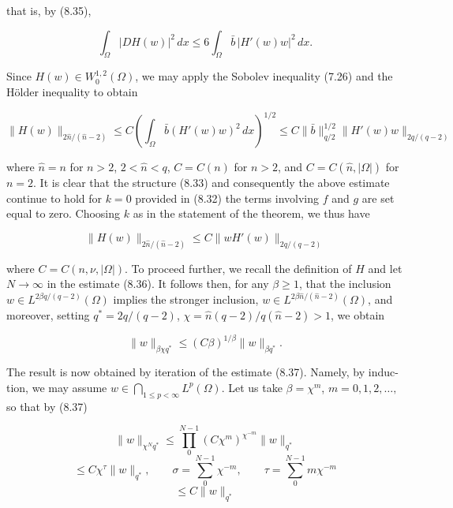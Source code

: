 
that is, by (8.35),

\begin{equation*}
\int_{\Omega} |DH(w)|^2\,dx \le 6 \int_{\Omega} \bar b\,|H'(w)w|^2\,dx.
\end{equation*}

Since $H(w)\in W_0^{1,2}(\Omega)$, we may apply the Sobolev inequality (7.26) and the Hölder
inequality to obtain

\begin{equation*}
\|H(w)\|_{2\hat n/(\hat n-2)} \le C\left(\int_{\Omega} \bar b(H'(w)w)^2\,dx\right)^{1/2}
 \le C\|\bar b\|_{q/2}^{1/2}\|H'(w)w\|_{2q/(q-2)}
\end{equation*}

where $\hat n=n$ for $n>2$, $2<\hat n<q$, $C=C(n)$ for $n>2$, and $C=C(\hat n,|\Omega|)$ for $n=2$. It is
clear that the structure (8.33) and consequently the above estimate continue to
hold for $k=0$ provided in (8.32) the terms involving $f$ and $g$ are set equal to zero.
Choosing $k$ as in the statement of the theorem, we thus have

\begin{equation}\tag{8.36}
\|H(w)\|_{2\hat n/(\hat n-2)} \le C\|wH'(w)\|_{2q/(q-2)}
\end{equation}

where $C=C(n,\nu,|\Omega|)$. To proceed further, we recall the definition of $H$ and let
$N\to\infty$ in the estimate (8.36). It follows then, for any $\beta\ge 1$, that the inclusion
$w\in L^{2\beta q/(q-2)}(\Omega)$ implies the stronger inclusion, $w\in L^{2\beta\hat n/(\hat n-2)}(\Omega)$, and moreover,
setting $q^*=2q/(q-2)$, $\chi=\hat n(q-2)/q(\hat n-2)>1$, we obtain

\begin{equation}\tag{8.37}
\|w\|_{\beta\chi q^*}\le (C\beta)^{1/\beta}\|w\|_{\beta q^*}.
\end{equation}

The result is now obtained by iteration of the estimate (8.37). Namely, by induc-
tion, we may assume $w\in\bigcap_{1\le p<\infty}L^p(\Omega)$. Let us take $\beta=\chi^m$, $m=0,1,2,\ldots,$ so that by
(8.37)

\begin{equation*}
\|w\|_{\chi^N q^*}\le \prod_{0}^{N-1}(C\chi^m)^{\chi^{-m}}\|w\|_{q^*}
\end{equation*}
\begin{equation*}
\le C\chi^\tau\|w\|_{q^*},\qquad \sigma=\sum_{0}^{N-1}\chi^{-m},\qquad \tau=\sum_{0}^{N-1} m\chi^{-m}
\end{equation*}
\begin{equation*}
\le C\|w\|_{q^*}
\end{equation*}

